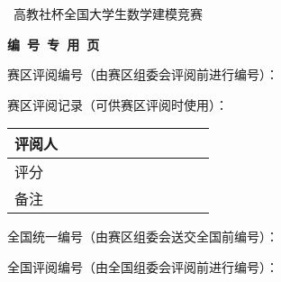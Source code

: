 \renewcommand{\baselinestretch}{1.3}\normalsize
\newpage
\thispagestyle{empty} %
{\fontsize{14pt}{\baselineskip}\selectfont \bfseries
\begin{center}{\Large\the\year}~高教社杯全国大学生数学建模竞赛\par\vspace{.5\baselineskip}\par
{\fontsize{15.75pt}{\baselineskip}\selectfont\bf 编\ 号\ 专\ 用\ 页}
\end{center}\par\vspace{1em}\par}
{%
\par\vfill
赛区评阅编号（由赛区组委会评阅前进行编号）：\par\vfill\vfill

赛区评阅记录（可供赛区评阅时使用）：\\
\begin{tabular}{|l|l|l|l|l|l|l|l|l|l|l|}
\hline
\multicolumn{1}{|c|}{\parbox[t]{0.5cm}{\vspace{1ex}评阅人\vspace{1ex}}\hfill}
&\multicolumn{1}{|c|}{\hspace{30pt}\hfill}
&\multicolumn{1}{|c|}{\hspace{30pt}\hfill}
&\multicolumn{1}{|c|}{\hspace{30pt}\hfill}
&\multicolumn{1}{|c|}{\hspace{30pt}\hfill}
&\multicolumn{1}{|c|}{\hspace{30pt}\hfill}
&\multicolumn{1}{|c|}{\hspace{30pt}\hfill}
&\multicolumn{1}{|c|}{\hspace{30pt}\hfill}
&\multicolumn{1}{|c|}{\hspace{30pt}\hfill}
&\multicolumn{1}{|c|}{\hspace{30pt}\hfill}
&\multicolumn{1}{|c|}{\hspace{30pt}\hfill}\\
\hline
\parbox[t]{0.5cm}{\vspace{1ex}评分\vspace{2ex}}& & & &
& & & & & &
\\\hline
\parbox[t]{0.5cm}{\vspace{1ex}备注\vspace{2ex}}& & & & & & & & & & \\\hline
\end{tabular}
\par\vfill\vfill

全国统一编号（由赛区组委会送交全国前编号）：\par\vfill\vfill\vfill


全国评阅编号（由全国组委会评阅前进行编号）：\par\vfill\vfill\vfill
}
\renewcommand{\baselinestretch}{1.3}\normalsize
{} 